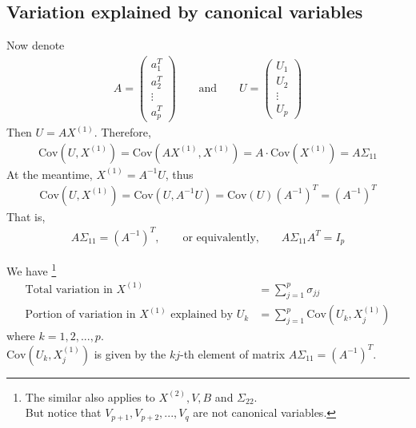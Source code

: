 \documentclass[12pt]{extarticle}
\newcommand{\<}{\langle}
\renewcommand{\>}{\rangle}
\theoremstyle{definition}
\begin{document}
\subsection{Variation explained by canonical variables}
Now denote
\begin{align*}
    A = \left(
    \begin{array}{c}
      a^T_1 \\
      a^T_2 \\
      \vdots \\
      a^T_p
    \end{array} \right) \qquad \text{and} \qquad 
    U = \left(
    \begin{array}{c}
      U_1 \\
      U_2 \\
      \vdots \\
      U_p
    \end{array} \right)
\end{align*}
Then $U=AX^{(1)}$. Therefore,
\begin{align*}
    \text{Cov}(U,X^{(1)}) = \text{Cov}(AX^{(1)},X^{(1)}) = A \cdot \text{Cov}(X^{(1)})=A\Sigma_{11} 
\end{align*}
At the meantime, $X^{(1)}=A^{-1}U$, thus
\begin{align*}
    \text{Cov}(U,X^{(1)})=\text{Cov}(U,A^{-1}U)=\text{Cov}(U)(A^{-1})^T=(A^{-1})^T
\end{align*}
That is,
\begin{align*}
    A\Sigma_{11}=(A^{-1})^T, \qquad \text{or equivalently,} \qquad A\Sigma_{11}A^T=I_p
\end{align*}

\begin{tcolorbox}[enhanced, drop fuzzy shadow, title=Variation explained by canonical variables]
We have \footnote{The similar also applies to $X^{(2)},V,B$ and $\Sigma_{22}$. \\
But notice that $V_{p+1},V_{p+2},...,V_q$ are not canonical variables.}
\begin{align*}
    \text{Total variation in }X^{(1)} &= \sum^p_{j=1}\sigma_{jj}\\
    \text{Portion of variation in $X^{(1)}$ explained by }U_k &= \sum^p_{j=1}\text{Cov}(U_k,X_j^{(1)})
\end{align*}
where $k=1,2,...,p$.\\
$\text{Cov}(U_k,X_j^{(1)})$ is given by the $kj$-th element of matrix $A\Sigma_{11} = (A^{-1})^T$.
\end{tcolorbox}
\end{document}
